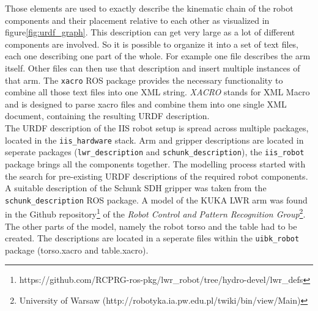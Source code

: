 Those elements are used to exactly describe the kinematic chain of the robot components and their placement relative to each other as visualized in figure\ref{fig:urdf_graph}. This description can get very large as a lot of different components are involved. So it is possible to organize it into a set of text files, each one describing one part of the whole. For example one file describes the arm itself. Other files can then use that description and insert multiple instances of that arm. The \texttt{xacro} ROS package provides the necessary functionality to combine all those text files into one XML string. \emph{XACRO} stands for XML Macro and is designed to parse xacro files and combine them into one single XML document, containing the resulting URDF description.\\

The URDF description of the IIS robot setup is spread across multiple packages, located in the \texttt{iis\_hardware} stack. Arm and gripper descriptions are located in seperate packages (\texttt{lwr\_description} and \texttt{schunk\_description}), the \texttt{iis\_robot} package brings all the components together. The modelling process started with the search for pre-existing URDF descriptions of the required robot components. A suitable description of the Schunk SDH gripper was taken from the \texttt{schunk\_description} ROS package. A model of the KUKA LWR arm was found in the Github repository\footnote{https://github.com/RCPRG-ros-pkg/lwr\_robot/tree/hydro-devel/lwr\_defs} of the \emph{Robot Control and Pattern Recognition Group}\footnote{University of Warsaw (http://robotyka.ia.pw.edu.pl/twiki/bin/view/Main)}. The other parts of the model, namely the robot torso and the table had to be created. The descriptions are located in a seperate files within the \texttt{uibk\_robot} package (torso.xacro and table.xacro).

